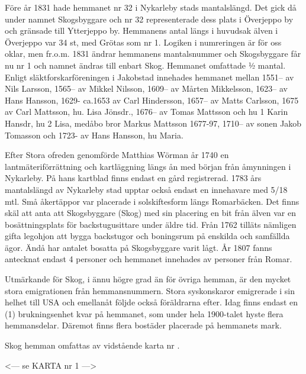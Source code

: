 %

Före år 1831 hade hemmanet nr 32 i Nykarleby stads mantalslängd. Det gick då under namnet Skogsbyggare och nr 32 representerade dess plats i Överjeppo by och gränsade till Ytterjeppo by. Hemmanens antal längs i huvudsak älven i Överjeppo var 34 st, med Grötas som nr 1. Logiken i numreringen är för oss oklar, men fr.o.m. 1831 ändrar hemmanens mantalsnummer och Skogsbyggare får nu nr 1 och namnet ändras till enbart Skog. Hemmanet omfattade ½ mantal. Enligt släktforskarföreningen i Jakobstad innehades hemmanet mellan 1551-- av Nils Larsson, 1565-- av Mikkel Nilsson, 1609-- av Mårten Mikkelsson, 1623-- av Hans Hansson, 1629- ca.1653 av Carl Hindersson, 1657-- av Matts Carlsson, 1675 av  Carl Mattsson, hu. Lisa Jönsdr., 1676-- av Tomas Mattsson och hu 1 Karin Hansdr, hu 2 Lisa, medåbo bror Markus Mattsson 1677-97, 1710-- av sonen Jakob Tomasson och 1723- av Hans Hansson, hu Maria.

Efter Stora ofreden genomförde Matthias Wörman år 1740 en lantmäteriförrättning och kartläggning längs ån med början från åmynningen i Nykarleby. På hans kartblad finns endast en gård registrerad. 1783 års mantalslängd av Nykarleby stad upptar också endast en innehavare med 5/18 mtl. Små åkertäppor var placerade i solskiftesform längs Romarbäcken. Det finns skäl att anta att Skogsbyggare (Skog) med sin placering en bit från älven var en bosättningsplats för backstugusittare under äldre tid. Från 1762 tilläts nämligen gifta legohjon att bygga backstugor och boningsrum på enskilda och samfällda ägor. Ändå har antalet bosatta på Skogsbyggare varit lågt. År 1807 fanns antecknat endast 4 personer och hemmanet innehades av personer från Romar.

Utmärkande för Skog, i ännu högre grad än för övriga hemman, är den mycket stora emigrationen från hemmansnummern. Stora syskonskaror emigrerade i sin helhet till USA och emellanåt följde också föräldrarna efter. Idag finns endast en (1) brukningsenhet kvar på hemmanet, som under hela 1900-talet hyste flera hemmansdelar. Däremot finns flera bostäder placerade på hemmanets mark.

Skog hemman omfattas av vidstående karta nr .


<--- se KARTA nr 1 --->


%



